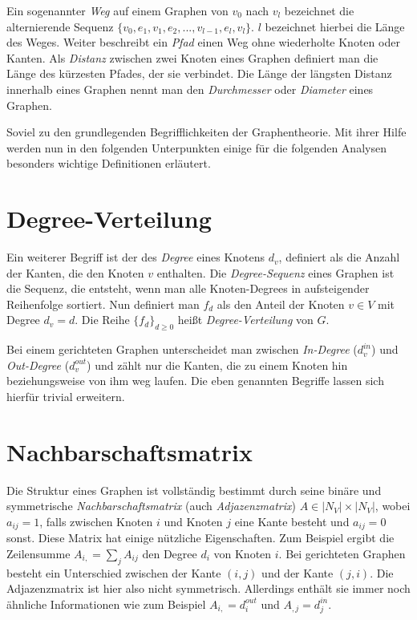 \documentclass[a4paper,ngerman,oneside,titlepage,bibliography=totoc,11pt]{scrreprt}
\begin{document}
Ein sogenannter \emph{Weg} auf einem Graphen von $v_0$ nach $v_l$ bezeichnet die alternierende Sequenz $\{v_0, e_1, v_1, e_2, ..., v_{l-1}, e_l, v_l\}$. $l$ bezeichnet hierbei die Länge des Weges. Weiter beschreibt ein \emph{Pfad} einen Weg ohne wiederholte Knoten oder Kanten. Als \emph{Distanz} zwischen zwei Knoten eines Graphen definiert man die Länge des kürzesten Pfades, der sie verbindet. Die Länge der längsten Distanz innerhalb eines Graphen nennt man den \emph{Durchmesser} oder \emph{Diameter} eines Graphen.

Soviel zu den grundlegenden Begrifflichkeiten der Graphentheorie. Mit ihrer Hilfe werden nun in den folgenden Unterpunkten einige für die folgenden Analysen besonders wichtige Definitionen erläutert.

\section{Degree-Verteilung}
Ein weiterer Begriff ist der des \emph{Degree} eines Knotens $d_v$, definiert als die Anzahl der Kanten, die den Knoten $v$ enthalten. Die \emph{Degree-Sequenz} eines Graphen ist die Sequenz, die entsteht, wenn man alle Knoten-Degrees in aufsteigender Reihenfolge sortiert. Nun definiert man $f_d$ als den Anteil der Knoten $v \in V$ mit Degree $d_v = d$. Die Reihe $\{f_d\}_{d \geq 0}$ heißt \emph{Degree-Verteilung} von $G$. 

Bei einem gerichteten Graphen unterscheidet man zwischen \emph{In-Degree} ($d_v^{in}$) und \emph{Out-Degree} ($d_v^{out}$) und zählt nur die Kanten, die zu einem Knoten hin beziehungsweise von ihm weg laufen. Die eben genannten Begriffe lassen sich hierfür trivial erweitern.

\section{Nachbarschaftsmatrix}

Die Struktur eines Graphen ist vollständig bestimmt durch seine binäre und symmetrische\emph{ Nachbarschaftsmatrix} (auch \emph{Adjazenzmatrix}) $A \in |N_V| \times |N_V|$, wobei $a_{ij} = 1$, falls zwischen Knoten $i$ und Knoten $j$ eine Kante besteht und $a_{ij} = 0$ sonst. Diese Matrix hat einige nützliche Eigenschaften. Zum Beispiel ergibt die Zeilensumme $A_{i,} = \sum_j{A_{ij}}$ den Degree $d_i$ von Knoten $i$.  
Bei gerichteten Graphen besteht ein Unterschied zwischen der Kante $(i,j)$ und der Kante $(j,i)$. Die Adjazenzmatrix ist hier also nicht symmetrisch. Allerdings enthält sie immer noch ähnliche Informationen wie zum Beispiel $A_{i,} = d_i^{out}$ und $A_{,j} = d_j^{in}$.
\end{document}
